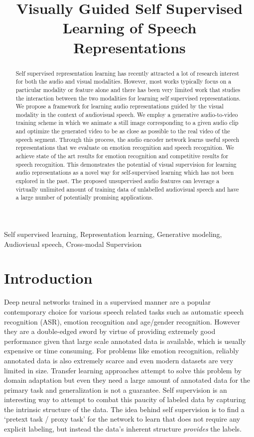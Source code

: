 \documentclass{article}
\title{Visually Guided Self Supervised Learning of Speech Representations}
\begin{document}
\maketitle
\begin{abstract}
Self supervised representation learning has recently attracted a lot of research interest for both the audio and visual modalities. However, most works typically focus on a particular modality or feature alone and there has been very limited work that studies the interaction between the two modalities for learning self supervised representations. We propose a framework for learning audio representations guided by the visual modality in the context of audiovisual speech. We employ a generative audio-to-video training scheme in which we animate a still image corresponding to a given audio clip and optimize the generated video to be as close as possible to the real video of the speech segment. Through this process, the audio encoder network learns useful speech representations that we evaluate on emotion recognition and speech recognition. We achieve state of the art results for emotion recognition and competitive results for speech recognition. This demonstrates the potential of visual supervision for learning audio representations as a novel way for self-supervised learning which has not been explored in the past. The proposed unsupervised audio features can leverage a virtually unlimited amount of training data of unlabelled audiovisual speech and have a large number of potentially promising applications.

\end{abstract}
\begin{keywords}
Self supervised learning, Representation learning, Generative modeling, Audiovisual speech, Cross-modal Supervision
\end{keywords}
\section{Introduction}
\label{sec:intro}

Deep neural networks trained in a supervised manner are a popular contemporary choice for various speech related tasks such as automatic speech recognition (ASR), emotion recognition and age/gender recognition. However they are a double-edged sword by virtue of providing extremely good performance given that large scale annotated data is available, which is usually expensive or time consuming. For problems like emotion recognition, reliably annotated data is also extremely scarce and even modern datasets are very limited in size. Transfer learning approaches attempt to solve this problem by domain adaptation but even they need a large amount of annotated data for the primary task and generalization is not a guarantee. Self supervision is an interesting way to attempt to combat this paucity of labeled data by capturing the intrinsic structure of the data. The idea behind self supervision is to find a `pretext task / proxy task' for the network to learn that does not require any explicit labeling, but instead the data's inherent structure \textit{provides} the labels.
\end{document}
